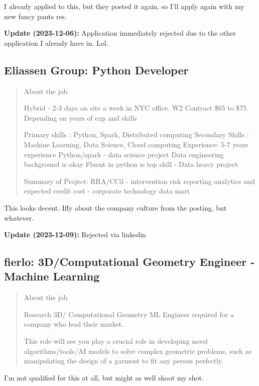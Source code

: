 \documentclass[
	letterpaper, %
	12pt, %
]{CSSullivanBusinessReport}
\begin{document}
I already applied to this, but they posted it again, so I'll apply again with my new fancy pants res.

\textbf{Update (2023-12-06):} Application immediately rejected due to the other application I already have in. Lol. 

\subsection[Eliassen Group]{Eliassen Group: Python Developer}

\begin{quote}
	About the job
	
	Hybrid - 2-3 days on site a week in NYC office.
	W2 Contract
	\$65 to \$75 Depending on years of exp and skills

	Primary skills : Python, Spark, Distributed computing 
	Secondary Skills : Machine Learning, Data Science, Cloud computing 
	Experience: 5-7 years experience Python/spark - data science project 
	Data engineering background is okay
	Fluent in python is top skill - Data heavy project 

	Summary of Project: RRA/CCil - intervention risk reporting analytics and expected credit cost - corporate technology data mart


\end{quote}

This looks decent. Iffy about the company culture from the posting, but whatever. 

\textbf{Update (2023-12-09):} Rejected via linkedin

\subsection[fierlo]{fierlo: 3D/Computational Geometry Engineer - Machine Learning}

\begin{quote}
	About the job
	
	Research 3D/ Computational Geometry ML Engineer required for a company who lead their market.

	This role will see you play a crucial role in developing novel algorithms/tools/AI models to solve complex geometric problems, such as manipulating the design of a garment to fit any person perfectly.

\end{quote}

I'm not qualified for this at all, but might as well shoot my shot. 
\end{document}
